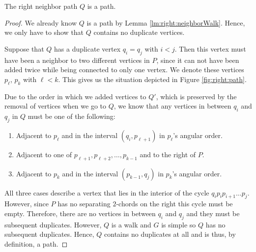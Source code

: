     \begin{lemma}
      \label{lm:right:neighborPath}
      The right neighbor path $Q$ is a path.
    \end{lemma}
    \begin{proof}
      We already know $Q$ is a path by Lemma \ref{lm:right:neighborWalk}. Hence, we only have to show that $Q$ contains no duplicate vertices.

      Suppose that $Q$ has a duplicate vertex $q_i=q_j$ with $i<j$.
      Then this vertex must have been a neighbor to two different vertices in $P$, since it can not have been added twice while being connected to only one vertex.
      We denote these vertices $p_\ell$, $p_k$ with $\ell<k$.
      This gives us the situation depicted in Figure \ref{fig:right:path}.

      Due to the order in which we added vertices to $Q'$, which is preserved by the removal of vertices when we go to $Q$, we know that any vertices in between $q_i$ and $q_j$ in $Q$ must be one of the following:
      \begin{enumerate}
        \item Adjacent to $p_\ell$ and in the interval $(q_i, p_{\ell+1})$ in $p_\ell$'s angular order.
        \item Adjacent to one of $p_{\ell+1},  p_{\ell+2},\ldots, p_{k-1}$ and to the right of $P$.
        \item Adjacent to $p_k$ and in the interval $(p_{k-1}, q_j)$ in $p_k$'s angular order.
      \end{enumerate}

      All three cases describe a vertex that lies in the interior of the cycle $q_i p_i p_{i+1} \ldots p_j$. However, since $P$ has no separating $2$-chords on the right this cycle must be empty. Therefore, there are no vertices in between $q_i$ and $q_j$ and they must be subsequent duplicates. However, $Q$ is a walk and $G$ is simple so $Q$ has no subsequent duplicates. Hence, $Q$ contains no duplicates at all and is thus, by definition, a path.
    \end{proof}

